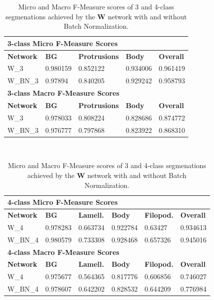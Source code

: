 \begin {table}
	\begin{flushleft}
		\begin {tabular}[!htb]{|l|l|l|l|l|}
			\hline\multicolumn{5}{|l|}{\textbf{3-class Micro F-Measure Scores}} \\ \hline
			\textbf{Network}& \textbf{BG}& \textbf{Protrusions}& \textbf{Body}& \textbf{Overall} \\ \hline
			W\_3& \cellcolor{green!25}0.980159& \cellcolor{green!25}0.852122& \cellcolor{green!25}0.934006& \cellcolor{green!25}0.961419 \\ \hline
			W\_BN\_3& 0.97894& 0.840205& 0.929242& 0.958793 \\ \hline
			\multicolumn{5}{|l|}{\textbf{3-class Macro F-Measure Scores}} \\ \hline
			\textbf{Network}& \textbf{BG}& \textbf{Protrusions}& \textbf{Body}& \textbf{Overall} \\ \hline
			W\_3& \cellcolor{green!25}0.978033& \cellcolor{green!25}0.808224& \cellcolor{green!25}0.828686& \cellcolor{green!25}0.874772 \\ \hline
			W\_BN\_3& 0.976777& 0.797868& 0.823922& 0.868310 \\ \hline
		\end {tabular}
		\vspace{0.5cm}\\
		\begin {tabular}[!htb]{|l|l|l|l|l|l|}
			\hline\multicolumn{6}{|l|}{\textbf{4-class Micro F-Measure Scores}} \\ \hline
			\textbf{Network}& \textbf{BG}& \textbf{Lamell.}& \textbf{Body}& \textbf{Filopod.}& \textbf{Overall} \\ \hline
			W\_4& 0.978283& 0.663734& 0.922784& 0.63427& 0.934613 \\ \hline
			W\_BN\_4& \cellcolor{green!25}0.980579& \cellcolor{green!25}0.733308& \cellcolor{green!25}0.928468& \cellcolor{green!25}0.657326& \cellcolor{green!25}0.945016 \\ \hline
			\multicolumn{6}{|l|}{\textbf{4-class Macro F-Measure Scores}} \\ \hline
			\textbf{Network}& \textbf{BG}& \textbf{Lamell.}& \textbf{Body}& \textbf{Filopod.}& \textbf{Overall} \\ \hline
			W\_4& 0.975677& 0.564365& 0.817776& 0.606856& 0.746027 \\ \hline
			W\_BN\_4& \cellcolor{green!25}0.978607& \cellcolor{green!25}0.642202& \cellcolor{green!25}0.828532& \cellcolor{green!25}0.644209& \cellcolor{green!25}0.776984 \\ \hline
		\end {tabular}
	\end {flushleft}

\caption[Micro and Macro F-Measure scores for a network with and without Batch Normalization.]{Micro and Macro F-Measure scores of 3 and 4-class segmenations achieved by the \textbf{W} network with and without Batch Normalization.}
\label{tab:results2}
\end {table}

